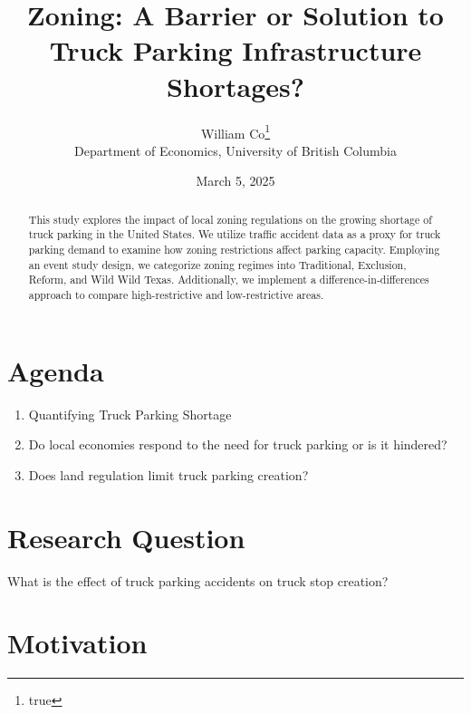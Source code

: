 \documentclass[
  12pt]{article}
\begin{document}
\def\spacingset#1{\renewcommand{\baselinestretch}%
{#1}\small\normalsize} \spacingset{1}



\date{March 5, 2025}
\title{\bf Zoning: A Barrier or Solution to Truck Parking Infrastructure
Shortages?}
\author{
William Co\thanks{true}\\
Department of Economics, University of British Columbia\\
}
\maketitle

\bigskip
\bigskip
\begin{abstract}
This study explores the impact of local zoning regulations on the
growing shortage of truck parking in the United States. We utilize
traffic accident data as a proxy for truck parking demand to examine how
zoning restrictions affect parking capacity. Employing an event study
design, we categorize zoning regimes into Traditional, Exclusion,
Reform, and Wild Wild Texas. Additionally, we implement a
difference-in-differences approach to compare high-restrictive and
low-restrictive areas.
\end{abstract}


\newpage
\spacingset{1.9} %

\section{Agenda}\label{agenda}

\begin{enumerate}
\def\labelenumi{\arabic{enumi}.}
\item
  Quantifying Truck Parking Shortage
\item
  Do local economies respond to the need for truck parking or is it
  hindered?
\item
  Does land regulation limit truck parking creation?
\end{enumerate}

\section{Research Question}\label{research-question}

What is the effect of truck parking accidents on truck stop creation?

\section{Motivation}\label{motivation}
\end{document}
